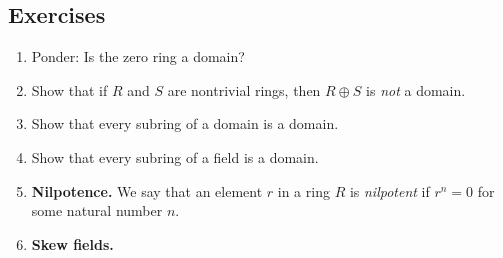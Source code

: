 \documentclass{article}
\begin{document}
\subsection*{Exercises}

\begin{enumerate}
\item Ponder: Is the zero ring a domain?

\item Show that if $R$ and $S$ are nontrivial rings, then $R \oplus S$ is \emph{not} a domain.

\item Show that every subring of a domain is a domain.

\item Show that every subring of a field is a domain.

\item \textbf{Nilpotence.} We say that an element $r$ in a ring $R$ is \emph{nilpotent} if $r^n = 0$ for some natural number $n$.

\item \textbf{Skew fields.}
\end{enumerate}
\end{document}
